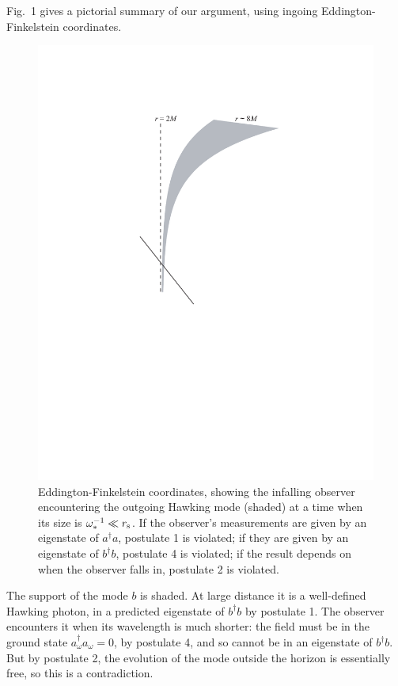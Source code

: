 \documentclass[12pt]{article}
\begin{document}
Fig.~1 gives a pictorial summary of our argument, using ingoing Eddington-Finkelstein coordinates.
\begin{figure}[t]
\begin{center}
\includegraphics[scale=.8]{EFcoords}
\end{center}
\vspace{-10pt}
\caption{Eddington-Finkelstein coordinates, showing the infalling observer encountering the outgoing Hawking mode (shaded) at a time when its size is $\omega_*^{-1} \ll r_{\rm s}$.   If the observer's measurements are given by an eigenstate of $a^\dagger a$, postulate 1 is violated; if they are given by an eigenstate of $b^\dagger b$, postulate 4 is violated; if the result depends on when the observer falls in, postulate 2 is violated.}
\end{figure}
The support of the mode $b$ is shaded.  At large distance it is a well-defined Hawking photon, in a predicted eigenstate of $b^\dagger b$ by postulate 1.  The observer encounters it when its wavelength is much shorter: the field must be in the ground state $a_\omega^\dagger a_\omega = 0$, by postulate 4, and so cannot be in an eigenstate of $b^\dagger b$. But by postulate 2, the evolution of the mode outside the horizon is essentially free, so this is a contradiction.
\end{document}
